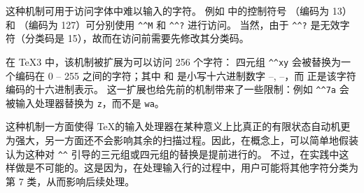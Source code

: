 \documentclass{book}
\begin{document}
这种机制可用于访问字体中难以输入的字符。
例如 \ascii 中的控制符号 （\ascii 编码为 13）和 （\ascii 编码为 127）可分别使用 \verb>^^M> 和 \verb>^^?> 进行访问。
当然，由于 \verb>^^?> 是无效字符（分类码是 15），故而在访问前需要先修改其分类码。

在 \TeX3 中，该机制被扩展为可以访问 256 个字符：
四元组 \verb-^^xy- 会被替换为一个编码在 0 -- 255 之间的字符；其中  和  是小写十六进制数字 --, --，而  正是该字符编码的十六进制表示。
这一扩展也给先前的机制带来了一些限制：例如 \verb>^^7a> 会被输入处理器替换为 \verb>z>，而不是 \verb>wa>。

这种机制一方面使得 \TeX 的输入处理器在某种意义上比真正的有限状态自动机更为强大，另一方面还不会影响其余的扫描过程。因此，在概念上，可以简单地假装认为这种对 \verb>^^> 引导的三元组或四元组的替换是提前进行的。
不过，在实践中这样做是不可能的。这是因为，在处理输入行的过程中，用户可能将其他字符分类为第 7 类，从而影响后续处理。
\end{document}
